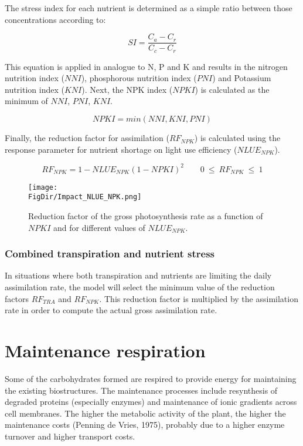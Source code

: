 The stress index for each nutrient is determined as a simple ratio between those 
concentrations according to:

\begin{equation}
SI = \frac{C_{a} - C_{r}}{C_{c} - C_{r}}
\end{equation}

This equation is applied in analogue to N, P and K and results in the
nitrogen nutrition index ($NNI$), phosphorous nutrition index ($PNI$) and
Potassium nutrition index ($KNI$). Next, the NPK index ($NPKI$) is calculated
as the minimum of $NNI$, $PNI$, $KNI$. 

\begin{equation}
NPKI = min(NNI, KNI, PNI)
\end{equation}

Finally, the reduction factor for
assimilation ($RF_{NPK}$) is calculated using the response parameter for nutrient
shortage on light use efficiency ($NLUE_{NPK}$).

\begin{equation}
RF_{NPK} = 1 - NLUE_{NPK}(1 - NPKI)^{2} ~~~~~~~~~0~\le ~RF_{NPK} ~\le ~1
\end{equation}


\begin{figure}[p]
	\centering
	\texttt{[image: \\FigDir/Impact\_NLUE\_NPK.png]}
	\caption{Reduction factor of the gross photosynthesis rate as a function of
		$NPKI$ and for different values of $NLUE_{NPK}$.}
	\label{fig:NLUE_NPK}
\end{figure}


\subsubsection{Combined transpiration and nutrient stress}

In situations where both transpiration and nutrients are limiting the daily assimilation rate,
the model will select the minimum value of the reduction factors $RF_{TRA}$ and $RF_{NPK}$. This
reduction factor is multiplied by the assimilation rate in order to compute the actual gross
assimilation rate.


\section{Maintenance respiration}

Some of the carbohydrates formed are respired to provide energy for maintaining the
existing biostructures. The maintenance processes include resynthesis of degraded proteins
(especially enzymes) and maintenance of ionic gradients across cell membranes. The
higher the metabolic activity of the plant, the higher the maintenance costs (Penning de
Vries, 1975), probably due to a higher enzyme turnover and higher transport costs.

